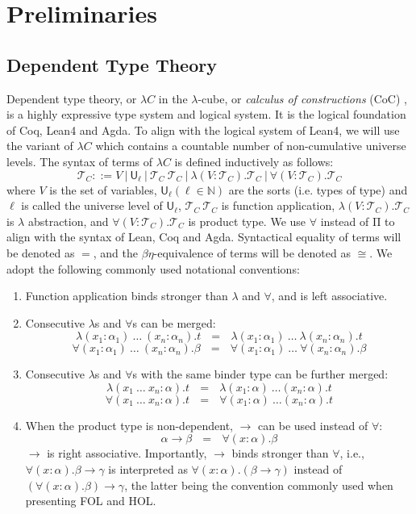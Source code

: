 \section{Preliminaries}

\subsection{Dependent Type Theory}\label{subdtt}

  Dependent type theory, or $\lambda C$ in the $\lambda$-cube,
  or \textit{calculus of constructions} (CoC) \cite{LambdaWithType},
  is a highly expressive type system and logical system. It is the logical
  foundation of Coq, Lean4 and Agda. To align with the logical system of
  Lean4, we will use the variant of $\lambda C$ which contains a countable
  number of non-cumulative universe levels. The syntax of terms of $\lambda C$ is defined
  inductively as follows:
  $$\mathcal{T}_C ::= V \ | \ \mathsf{U}_\ell \ | \ \mathcal{T}_C \ \mathcal{T}_C \ |
    \ \lambda (V : \mathcal{T}_C). \mathcal{T}_C \ | \ \forall (V : \mathcal{T}_C). \mathcal{T}_C$$
  where $V$ is the set of variables, $\mathsf{U}_\ell (\ell \in \mathbb{N})$ are
  the sorts (i.e. types of type) and $\ell$ is called the universe level
  of $\mathsf{U}_\ell$, $\mathcal{T}_C \ \mathcal{T}_C$ is function application,
  $\lambda (V : \mathcal{T}_C). \mathcal{T}_C$ is $\lambda$ abstraction, and
  $\forall (V : \mathcal{T}_C). \mathcal{T}_C$ is product type.
  We use $\forall$ instead of $\mathrm{\Pi}$ to align with the syntax of Lean, Coq and Agda.
  Syntactical equality of terms will be denoted as $=$, and the $\beta\eta$-equivalence of terms will be
  denoted as $\cong$. We adopt the following commonly used notational conventions:
  \begin{enumerate}
    \item Function application binds stronger than $\lambda$ and $\forall$, and is left associative.
    \item Consecutive $\lambda$s and $\forall$s can be merged:
      $$\lambda (x_1 : \alpha_1) \ \dots \ (x_n : \alpha_n). t \ \ \ = \ \ \ \lambda (x_1 : \alpha_1) \ \dots \ \lambda (x_n : \alpha_n). t$$
      $$\forall (x_1 : \alpha_1) \ \dots \ (x_n : \alpha_n). \beta \ \ \ = \ \ \ \forall (x_1 : \alpha_1) \ \dots \ \forall (x_n : \alpha_n). \beta$$
    \item Consecutive $\lambda$s and $\forall$s with the same binder type can be further merged:
      $$\lambda (x_1 \ \dots \ x_n : \alpha) . t \ \ \ = \ \ \ \lambda (x_1 : \alpha) \ \dots (x_n : \alpha). t$$
      $$\forall (x_1 \ \dots \ x_n : \alpha) . t \ \ \ = \ \ \ \forall (x_1 : \alpha) \ \dots (x_n : \alpha). t$$
    \item When the product type is non-dependent, $\to$ can be used instead of $\forall$:
      $$\alpha \to \beta \ \ \ = \ \ \ \forall (x : \alpha). \beta$$
      $\to$ is right associative. Importantly, $\to$ binds stronger than $\forall$, i.e.,
      $\forall (x : \alpha). \beta \to \gamma$ is interpreted as $\forall (x : \alpha). (\beta \to \gamma)$
      instead of $(\forall (x : \alpha). \beta) \to \gamma$, the latter being the convention commonly used
      when presenting FOL and HOL.
  \end{enumerate}

